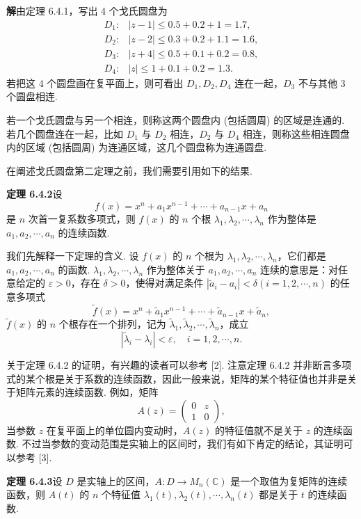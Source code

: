 \documentclass[UTF8,12pt,a4paper,fontset=fandol]{ctexart}
\begin{document}
\noindent\textbf{解}\quad 由定理 6.4.1，写出 4 个戈氏圆盘为
\[
\begin{array}{ll}
D_1: & |z-1|\leq 0.5+0.2+1=1.7,\\
D_2: & |z-2|\leq 0.3+0.2+1.1=1.6,\\
D_3: & |z+4|\leq 0.5+0.1+0.2=0.8,\\
D_4: & |z|\leq 1+0.1+0.2=1.3.
\end{array}
\]
若把这 4 个圆盘画在复平面上，则可看出 $D_1,D_2,D_4$ 连在一起，$D_3$ 不与其他 3 个圆盘相连.

若一个戈氏圆盘与另一个相连，则称这两个圆盘内 (包括圆周) 的区域是连通的. 若几个圆盘连在一起，比如 $D_1$ 与 $D_2$ 相连，$D_2$ 与 $D_4$ 相连，则称这些相连圆盘内的区域 (包括圆周) 为连通区域，这几个圆盘称为连通圆盘.

在阐述戈氏圆盘第二定理之前，我们需要引用如下的结果.

\noindent\textbf{定理 6.4.2}\quad 设
\[
f(x)=x^n+a_1x^{n-1}+\cdots+a_{n-1}x+a_n
\]
是 $n$ 次首一复系数多项式，则 $f(x)$ 的 $n$ 个根 $\lambda_1,\lambda_2,\cdots,\lambda_n$ 作为整体是 $a_1,a_2,\cdots,a_n$ 的连续函数.

我们先解释一下定理的含义. 设 $f(x)$ 的 $n$ 个根为 $\lambda_1,\lambda_2,\cdots,\lambda_n$，它们都是 $a_1,a_2,\cdots,a_n$ 的函数. $\lambda_1,\lambda_2,\cdots,\lambda_n$ 作为整体关于 $a_1,a_2,\cdots,a_n$ 连续的意思是：对任意给定的 $\varepsilon>0$，存在 $\delta>0$，使得对满足条件 $|\widetilde{a}_i-a_i|<\delta(i=1,2,\cdots,n)$ 的任意多项式
\[
\widetilde{f}(x)=x^n+\widetilde{a}_1x^{n-1}+\cdots+\widetilde{a}_{n-1}x+\widetilde{a}_n,
\]
$\widetilde{f}(x)$ 的 $n$ 个根存在一个排列，记为 $\widetilde{\lambda}_1,\widetilde{\lambda}_2,\cdots,\widetilde{\lambda}_n$，成立
\[
|\widetilde{\lambda}_i-\lambda_i|<\varepsilon,\quad i=1,2,\cdots,n.
\]

关于定理 6.4.2 的证明，有兴趣的读者可以参考 [2]. 注意定理 6.4.2 并非断言多项式的某个根是关于系数的连续函数，因此一般来说，矩阵的某个特征值也并非是关于矩阵元素的连续函数. 例如，矩阵
\[
A(z)=\left(\begin{array}{cc}
0 & z\\
1 & 0
\end{array}\right),
\]
当参数 $z$ 在复平面上的单位圆内变动时，$A(z)$ 的特征值就不是关于 $z$ 的连续函数. 不过当参数的变动范围是实轴上的区间时，我们有如下肯定的结论，其证明可以参考 [3].

\noindent\textbf{定理 6.4.3}\quad 设 $D$ 是实轴上的区间，$A:D\to M_n(\mathbb{C})$ 是一个取值为复矩阵的连续函数，则 $A(t)$ 的 $n$ 个特征值 $\lambda_1(t),\lambda_2(t),\cdots,\lambda_n(t)$ 都是关于 $t$ 的连续函数.
\end{document}
